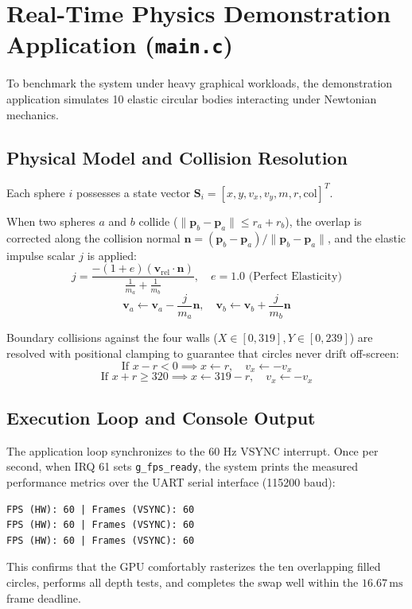 \section{Real-Time Physics Demonstration Application (\texttt{main.c})}
To benchmark the system under heavy graphical workloads, the demonstration application simulates 10 elastic circular bodies interacting under Newtonian mechanics.

\subsection{Physical Model and Collision Resolution}
Each sphere $i$ possesses a state vector $\mathbf{S}_i = [x, y, v_x, v_y, m, r, \text{col}]^T$. 

When two spheres $a$ and $b$ collide ($\|\mathbf{p}_b - \mathbf{p}_a\| \le r_a + r_b$), the overlap is corrected along the collision normal $\mathbf{n} = (\mathbf{p}_b - \mathbf{p}_a)/\|\mathbf{p}_b - \mathbf{p}_a\|$, and the elastic impulse scalar $j$ is applied:
\begin{equation}
j = \frac{-(1 + e)(\mathbf{v}_{\text{rel}} \cdot \mathbf{n})}{\frac{1}{m_a} + \frac{1}{m_b}}, \quad e = 1.0 \text{ (Perfect Elasticity)}
\end{equation}
\begin{equation}
\mathbf{v}_a \gets \mathbf{v}_a - \frac{j}{m_a}\mathbf{n}, \quad \mathbf{v}_b \gets \mathbf{v}_b + \frac{j}{m_b}\mathbf{n}
\end{equation}

Boundary collisions against the four walls ($X \in [0, 319], Y \in [0, 239]$) are resolved with positional clamping to guarantee that circles never drift off-screen:
\begin{equation}
\text{If } x - r < 0 \implies x \gets r, \quad v_x \gets -v_x
\end{equation}
\begin{equation}
\text{If } x + r \ge 320 \implies x \gets 319 - r, \quad v_x \gets -v_x
\end{equation}

\subsection{Execution Loop and Console Output}
The application loop synchronizes to the 60 Hz VSYNC interrupt. Once per second, when IRQ 61 sets \texttt{g\_fps\_ready}, the system prints the measured performance metrics over the UART serial interface (115200 baud):
\begin{verbatim}
FPS (HW): 60 | Frames (VSYNC): 60
FPS (HW): 60 | Frames (VSYNC): 60
FPS (HW): 60 | Frames (VSYNC): 60
\end{verbatim}
This confirms that the GPU comfortably rasterizes the ten overlapping filled circles, performs all depth tests, and completes the swap well within the $16.67\,\text{ms}$ frame deadline.
